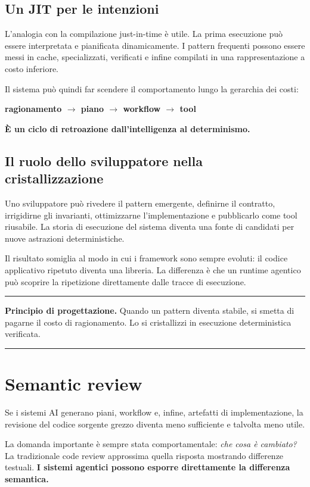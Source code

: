 \documentclass[10pt,oneside,openany]{book}
\newcommand{\principle}[1]{%
  \vspace{4pt}
  \noindent\begin{minipage}{\linewidth}
  \hrule\vspace{5pt}
  \small\sffamily\raggedright\textbf{Principio di progettazione.} #1
  \vspace{5pt}\hrule
  \end{minipage}\vspace{4pt}
}
\begin{document}
\section{Un JIT per le intenzioni}
L'analogia con la compilazione just-in-time è utile. La prima esecuzione può essere interpretata e pianificata dinamicamente. I pattern frequenti possono essere messi in cache, specializzati, verificati e infine compilati in una rappresentazione a costo inferiore.

Il sistema può quindi far scendere il comportamento lungo la gerarchia dei costi:

\begin{center}
\sffamily\bfseries
ragionamento $\rightarrow$ piano $\rightarrow$ workflow $\rightarrow$ tool
\end{center}

\textbf{È un ciclo di retroazione dall'intelligenza al determinismo.}

\section{Il ruolo dello sviluppatore nella cristallizzazione}
Uno sviluppatore può rivedere il pattern emergente, definirne il contratto, irrigidirne gli invarianti, ottimizzarne l'implementazione e pubblicarlo come tool riusabile. La storia di esecuzione del sistema diventa una fonte di candidati per nuove astrazioni deterministiche.

Il risultato somiglia al modo in cui i framework sono sempre evoluti: il codice applicativo ripetuto diventa una libreria. La differenza è che un runtime agentico può scoprire la ripetizione direttamente dalle tracce di esecuzione.

\principle{Quando un pattern diventa stabile, si smetta di pagarne il costo di ragionamento. Lo si cristallizzi in esecuzione deterministica verificata.}

\chapter{Semantic review}

Se i sistemi AI generano piani, workflow e, infine, artefatti di implementazione, la revisione del codice sorgente grezzo diventa meno sufficiente e talvolta meno utile.

La domanda importante è sempre stata comportamentale: \emph{che cosa è cambiato?} La tradizionale code review approssima quella risposta mostrando differenze testuali. \textbf{I sistemi agentici possono esporre direttamente la differenza semantica.}
\end{document}
